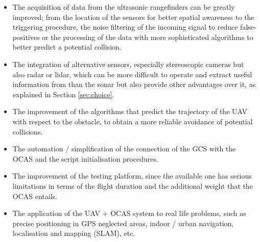 \begin{itemize}

	\item The acquisition of data from the ultrasonic rangefinders can be greatly improved; from the location of the sensors for better spatial awareness to the triggering procedure, the noise filtering of the incoming signal to reduce false-positives or the processing of the data with more sophisticated algorithms to better predict a potential collision.

	\item The integration of alternative sensors, especially stereoscopic cameras but also radar or lidar, which can be more difficult to operate and extract useful information from than the sonar but also provide other advantages over it, as explained in Section \ref{sec:choice}.

	\item The improvement of the algorithms that predict the trajectory of the UAV with respect to the obstacle, to obtain a more reliable avoidance of potential collisions.

	\item The automation / simplification of the connection of the GCS with the OCAS and the script initialisation procedures.

	\item The improvement of the testing platform, since the available one has serious limitations in terms of the flight duration and the additional weight that the OCAS entails.

	\item The application of the UAV + OCAS system to real life problems, such as precise positioning in GPS neglected areas, indoor / urban navigation, localisation and mapping (SLAM), etc.

\end{itemize}
